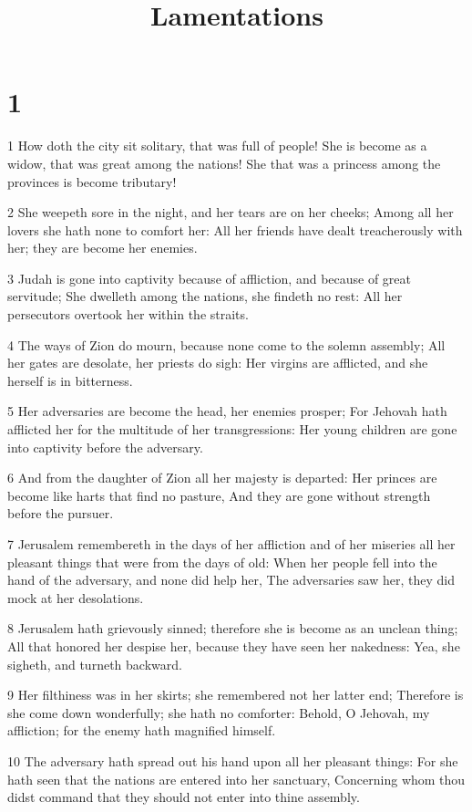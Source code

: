

\title{Lamentations}

\chapter{1}

\par 1 How doth the city sit solitary, that was full of people! She is become as a widow, that was great among the nations! She that was a princess among the provinces is become tributary!
\par 2 She weepeth sore in the night, and her tears are on her cheeks; Among all her lovers she hath none to comfort her: All her friends have dealt treacherously with her; they are become her enemies.
\par 3 Judah is gone into captivity because of affliction, and because of great servitude; She dwelleth among the nations, she findeth no rest: All her persecutors overtook her within the straits.
\par 4 The ways of Zion do mourn, because none come to the solemn assembly; All her gates are desolate, her priests do sigh: Her virgins are afflicted, and she herself is in bitterness.
\par 5 Her adversaries are become the head, her enemies prosper; For Jehovah hath afflicted her for the multitude of her transgressions: Her young children are gone into captivity before the adversary.
\par 6 And from the daughter of Zion all her majesty is departed: Her princes are become like harts that find no pasture, And they are gone without strength before the pursuer.
\par 7 Jerusalem remembereth in the days of her affliction and of her miseries all her pleasant things that were from the days of old: When her people fell into the hand of the adversary, and none did help her, The adversaries saw her, they did mock at her desolations.
\par 8 Jerusalem hath grievously sinned; therefore she is become as an unclean thing; All that honored her despise her, because they have seen her nakedness: Yea, she sigheth, and turneth backward.
\par 9 Her filthiness was in her skirts; she remembered not her latter end; Therefore is she come down wonderfully; she hath no comforter: Behold, O Jehovah, my affliction; for the enemy hath magnified himself.
\par 10 The adversary hath spread out his hand upon all her pleasant things: For she hath seen that the nations are entered into her sanctuary, Concerning whom thou didst command that they should not enter into thine assembly.
